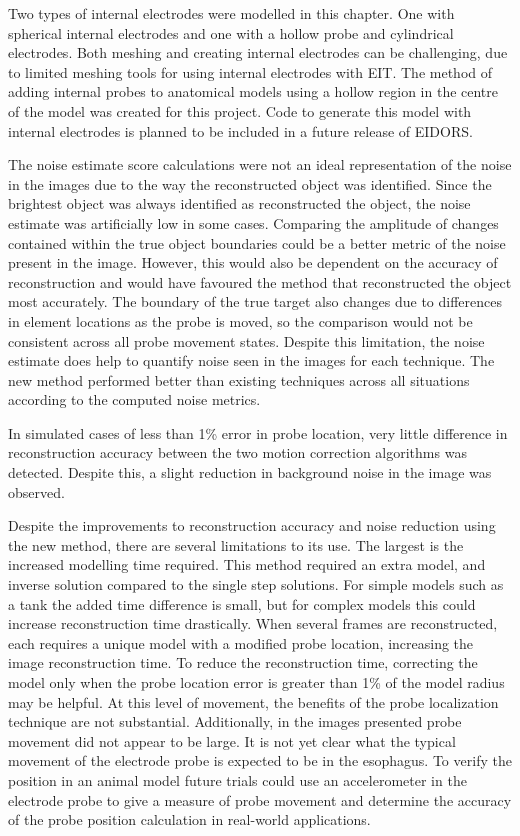 Two types of internal electrodes were modelled in this chapter. One with
spherical internal electrodes and one with a hollow probe and cylindrical electrodes. 
Both meshing and creating internal electrodes can be challenging, due to limited meshing tools 
for using internal electrodes with EIT. The method of adding internal probes to
anatomical models using a hollow region in the centre of the model was created for this 
project. Code to generate this model with internal electrodes is planned to be included in a
future release of EIDORS.

The noise estimate score calculations were not an ideal representation of the noise
in the images due to the way the reconstructed object was identified.  Since the
brightest object was always identified as reconstructed the object, the noise estimate was
artificially low in some cases. 
Comparing the amplitude of changes contained within the true
object boundaries could be a better metric of the noise present in the image. 
However, this
would also be dependent on the accuracy of reconstruction and would have favoured
the method that reconstructed the object most accurately.
The boundary of the true target
also changes due to differences in element locations as the 
probe is moved, so the comparison would not be consistent across all probe movement
states. Despite this limitation, the noise estimate does help to quantify 
noise seen in the images for each technique. 
The new
method performed better than existing techniques across all situations according to the computed
noise metrics.

In simulated cases of less than 1\% error in probe location, very little 
difference in reconstruction accuracy between 
the two motion correction algorithms was detected. 
Despite this, a slight reduction 
in background noise in the image was observed. 

Despite the improvements to reconstruction accuracy 
and noise reduction using the new method, there are several limitations to its use. 
The largest is 
the increased modelling time required. This method required an extra model, and inverse 
solution compared to the single step solutions. For simple models such as 
a tank the added time difference
is small, but for complex models this could increase reconstruction time drastically. 
When several frames are reconstructed, each requires a unique model 
with a modified probe location, increasing the image reconstruction time. 
To reduce the reconstruction 
time, correcting the model only when the  probe location error is greater than 1\%
of the model radius may be helpful. At this 
level of movement, the benefits of 
the probe localization technique are 
not substantial. 
Additionally, in the images presented probe movement did not 
appear to be large. It is not yet clear what the typical movement of the electrode probe 
is expected to be in the esophagus. To verify the position in an 
animal model future trials could use an accelerometer in the electrode 
probe to give a measure of probe movement and determine the accuracy of the probe position 
calculation in real-world applications.

